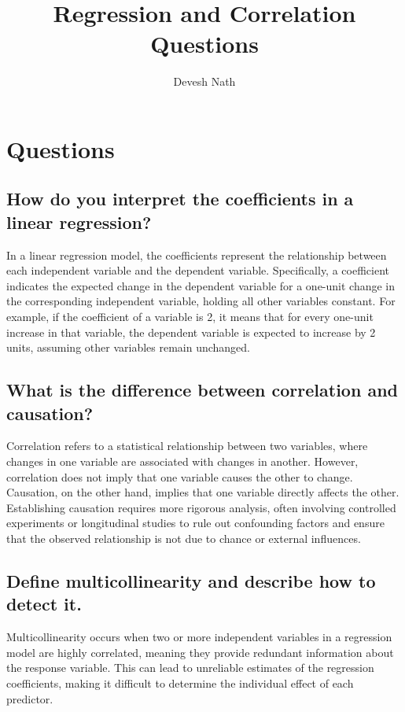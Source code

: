 \documentclass[12pt]{article}
\title{Regression and Correlation Questions}
\author{Devesh Nath}
\date{}
\begin{document}
\maketitle

\section{Questions}

\subsection{How do you interpret the coefficients in a linear regression?}

In a linear regression model, the coefficients represent the relationship between each independent variable and the dependent variable. Specifically, a coefficient indicates the expected change in the dependent variable for a one-unit change in the corresponding independent variable, holding all other variables constant. For example, if the coefficient of a variable is 2, it means that for every one-unit increase in that variable, the dependent variable is expected to increase by 2 units, assuming other variables remain unchanged.

\subsection{What is the difference between correlation and causation?}

Correlation refers to a statistical relationship between two variables, where changes in one variable are associated with changes in another. However, correlation does not imply that one variable causes the other to change. Causation, on the other hand, implies that one variable directly affects the other. Establishing causation requires more rigorous analysis, often involving controlled experiments or longitudinal studies to rule out confounding factors and ensure that the observed relationship is not due to chance or external influences.

\subsection{Define multicollinearity and describe how to detect it.}

Multicollinearity occurs when two or more independent variables in a regression model are highly correlated, meaning they provide redundant information about the response variable. This can lead to unreliable estimates of the regression coefficients, making it difficult to determine the individual effect of each predictor.
\end{document}
